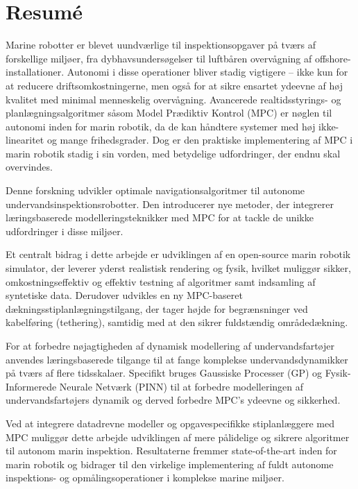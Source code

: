 \chapter*{Resum\'e}
Marine robotter er blevet uundværlige til inspektionsopgaver på tværs af forskellige miljøer, fra dybhavsundersøgelser til luftbåren overvågning af offshore-installationer. Autonomi i disse operationer bliver stadig vigtigere – ikke kun for at reducere driftsomkostningerne, men også for at sikre ensartet ydeevne af høj kvalitet med minimal menneskelig overvågning. Avancerede realtidsstyrings- og planlægningsalgoritmer såsom Model Prædiktiv Kontrol (MPC) er nøglen til autonomi inden for marin robotik, da de kan håndtere systemer med høj ikke-linearitet og mange frihedsgrader. Dog er den praktiske implementering af MPC i marin robotik stadig i sin vorden, med betydelige udfordringer, der endnu skal overvindes.

Denne forskning udvikler optimale navigationsalgoritmer til autonome undervandsinspektionsrobotter. Den introducerer nye metoder, der integrerer læringsbaserede modelleringsteknikker med MPC for at tackle de unikke udfordringer i disse miljøer.

Et centralt bidrag i dette arbejde er udviklingen af en open-source marin robotik simulator, der leverer yderst realistisk rendering og fysik, hvilket muliggør sikker, omkostningseffektiv og effektiv testning af algoritmer samt indsamling af syntetiske data. Derudover udvikles en ny MPC-baseret dækningsstiplanlægningstilgang, der tager højde for begrænsninger ved kabelføring (tethering), samtidig med at den sikrer fuldstændig områdedækning.

For at forbedre nøjagtigheden af dynamisk modellering af undervandsfartøjer anvendes læringsbaserede tilgange til at fange komplekse undervandsdynamikker på tværs af flere tidsskalaer. Specifikt bruges Gaussiske Processer (GP) og Fysik-Informerede Neurale Netværk (PINN) til at forbedre modelleringen af undervandsfartøjers dynamik og derved forbedre MPC's ydeevne og sikkerhed.

Ved at integrere datadrevne modeller og opgavespecifikke stiplanlæggere med MPC muliggør dette arbejde udviklingen af mere pålidelige og sikrere algoritmer til autonom marin inspektion. Resultaterne fremmer state-of-the-art inden for marin robotik og bidrager til den virkelige implementering af fuldt autonome inspektions- og opmålingsoperationer i komplekse marine miljøer.

